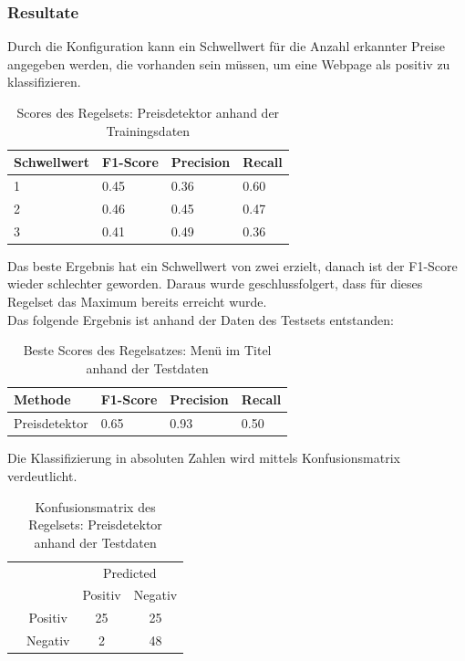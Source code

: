\subsubsection{Resultate}
Durch die Konfiguration kann ein Schwellwert für die Anzahl erkannter Preise angegeben werden, die vorhanden sein müssen, um eine Webpage als positiv zu klassifizieren.\\
\begin{table}[H]
	\caption{Scores des Regelsets: Preisdetektor anhand der Trainingsdaten}
	\centering
	\begin{tabular}{|l|l|l|l|}
		\hline
		Schwellwert & F1-Score & Precision & Recall\\
		\hline
		1 & 0.45 & 0.36 & 0.60  \\
		2 & 0.46 & 0.45 & 0.47 \\
		3 & 0.41 & 0.49 & 0.36 \\
		\hline
	\end{tabular}
\end{table}
Das beste Ergebnis hat ein Schwellwert von zwei erzielt, danach ist der F1-Score wieder schlechter geworden.
Daraus wurde geschlussfolgert, dass für dieses Regelset das Maximum bereits erreicht wurde.
\\
Das folgende Ergebnis ist anhand der Daten des Testsets entstanden:
\begin{table}[H]
	\caption{Beste Scores des Regelsatzes: Menü im Titel anhand der Testdaten} 
	\centering
	\begin{tabular}{|l|l|l|l|}
		\hline
		Methode & F1-Score & Precision & Recall\\
		\hline
		Preisdetektor & 0.65 & 0.93 & 0.50 \\
		\hline
	\end{tabular}
\end{table}
Die Klassifizierung in absoluten Zahlen wird mittels Konfusionsmatrix verdeutlicht.
\begin{table}[H]
	\caption{Konfusionsmatrix des Regelsets: Preisdetektor anhand der Testdaten}
	\centering
	\begin{tabular}{@{}cc|cc@{}}
		\multicolumn{1}{c}{} &\multicolumn{1}{c}{} &\multicolumn{2}{c}{Predicted} \\ 
		\multicolumn{1}{c}{} & 
		\multicolumn{1}{c|}{} & 
		\multicolumn{1}{c}{Positiv} & 
		\multicolumn{1}{c}{Negativ} \\ 
		\cline{2-4}
		\multirow[c]{2}{*}{\rotatebox[origin=tr]{90}{Actual}}
		& Positiv  & 25   & 25   \\[1.5ex]
		& Negativ  & 2    & 48 \\ 
		\cline{2-4}
	\end{tabular}
\end{table}
